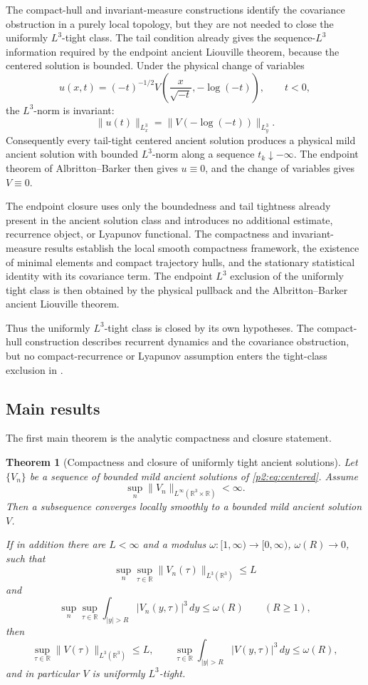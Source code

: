\documentclass[11pt]{amsart}
\theoremstyle{plain}
\newtheorem{theorem}{Theorem}[section]
\theoremstyle{definition}
\theoremstyle{remark}
\numberwithin{equation}{section}
\newcommand{\R}{\mathbb R}
\begin{document}
The compact-hull and invariant-measure constructions identify the covariance
obstruction in a purely local topology, but they are not needed to close the
uniformly \(L^3\)-tight class.  The tail condition already gives the
sequence-\(L^3\) information required by the endpoint ancient Liouville theorem,
because the centered solution is bounded.  Under the physical change of variables
\[
   u(x,t)=(-t)^{-1/2}
   V\left(\frac{x}{\sqrt{-t}},-\log(-t)\right),
   \qquad t<0,
\]
the \(L^3\)-norm is invariant:
\[
   \|u(t)\|_{L^3_x}
   =
   \|V(-\log(-t))\|_{L^3_y}.
\]
Consequently every tail-tight centered ancient solution produces
a physical mild ancient solution with bounded \(L^3\)-norm along a
sequence \(t_k\downarrow-\infty\).  The endpoint theorem of
Albritton--Barker \cite{AlbrittonBarker2019} then gives \(u\equiv0\), and the
change of variables gives \(V\equiv0\).

The endpoint closure uses only the boundedness and tail tightness already
present in the ancient solution class and introduces no additional estimate,
recurrence object, or Lyapunov functional.  The compactness and
invariant-measure results establish the
local smooth compactness framework, the existence of minimal elements and
compact trajectory hulls, and the stationary statistical identity with its
covariance term.  The endpoint \(L^3\) exclusion of the uniformly tight class
is then obtained by the physical pullback and the Albritton--Barker ancient
Liouville theorem.

Thus the uniformly \(L^3\)-tight class is closed by its own hypotheses.  The
compact-hull construction describes recurrent dynamics and the
covariance obstruction, but no compact-recurrence or Lyapunov assumption enters
the tight-class exclusion in .

\subsection{Main results}

The first main theorem is the analytic compactness and closure statement.

\begin{theorem}[Compactness and closure of uniformly tight ancient solutions]
\label{p2:thm:tight-compactness-intro}
Let \(\{V_n\}\) be a sequence of bounded mild ancient solutions of
\eqref{p2:eq:centered}.  Assume
\[
   \sup_n\|V_n\|_{L^\infty(\R^3\times\R)}<\infty .
\]
Then a subsequence converges locally smoothly to a bounded mild ancient
solution \(V\).

If in addition there are \(L<\infty\) and a modulus
\(\omega:[1,\infty)\to[0,\infty)\), \(\omega(R)\to0\), such that
\[
   \sup_n\sup_{\tau\in\R}\|V_n(\tau)\|_{L^3(\R^3)}\le L
\]
and
\[
   \sup_n\sup_{\tau\in\R}
   \int_{|y|>R}|V_n(y,\tau)|^3\,dy\le \omega(R)
   \qquad (R\ge1),
\]
then
\[
   \sup_{\tau\in\R}\|V(\tau)\|_{L^3(\R^3)}\le L,
   \qquad
   \sup_{\tau\in\R}\int_{|y|>R}|V(y,\tau)|^3\,dy\le\omega(R),
\]
and in particular \(V\) is uniformly \(L^3\)-tight.
\end{theorem}
\end{document}
